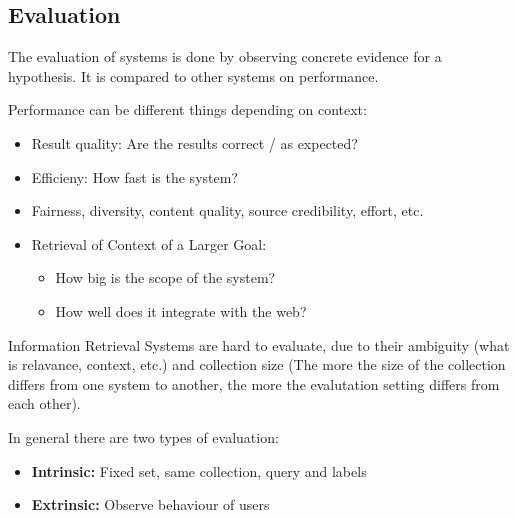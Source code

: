 \documentclass[
../../NLP4W_Summary.tex,
]
{subfiles}
\begin{document}
\newpage
\subsection{Evaluation}
The evaluation of systems is done by observing concrete evidence for a hypothesis. It is compared to other systems on performance.

Performance can be different things depending on context:
\begin{itemize}
    \item Result quality: Are the results correct / as expected?
    \item Efficieny: How fast is the system?
    \item Fairness, diversity, content quality, source credibility, effort, etc.
    \item Retrieval of Context of a Larger Goal:
    \begin{itemize}
        \item How big is the scope of the system?
        \item How well does it integrate with the web?
    \end{itemize}
\end{itemize}

Information Retrieval Systems are hard to evaluate, due to their ambiguity (what is relavance, context, etc.) and collection size (The more the size of the collection differs from one system to another, the more the evalutation setting differs from each other).

In general there are two types of evaluation:
\begin{itemize}
    \item \textbf{Intrinsic:} Fixed set, same collection, query and labels
    \item \textbf{Extrinsic:} Observe behaviour of users
\end{itemize}
\end{document}
